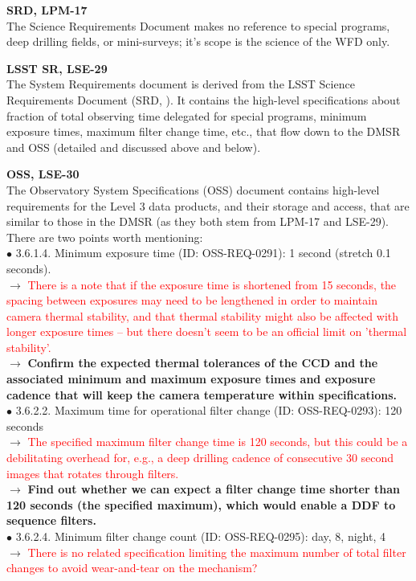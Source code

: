 \documentclass[DM,lsstdraft,toc]{lsstdoc}
\begin{document}
\noindent \textbf{SRD, LPM-17}\\
The Science Requirements Document \citep{LPM-17} makes no reference to special programs, deep drilling fields, or mini-surveys; it's scope is the science of the WFD only.

\noindent \textbf{LSST SR, LSE-29}\\
The System Requirements document \citep{LSE-29} is derived from the LSST Science Requirements Document (SRD, \citep{LPM-17}). It contains the high-level specifications about fraction of total observing time delegated for special programs, minimum exposure times, maximum filter change time, etc., that flow down to the DMSR and OSS (detailed and discussed above and below).

\noindent \textbf{OSS, LSE-30}\\
The Observatory System Specifications (OSS) document \citep{LSE-30} contains high-level requirements for the Level 3 data products, and their storage and access, that are similar to those in the DMSR (as they both stem from LPM-17 and LSE-29). There are two points worth mentioning: \\
$\bullet$ 3.6.1.4. Minimum exposure time (ID: OSS-REQ-0291): 1 second (stretch 0.1 seconds). \\
$\rightarrow$ \textcolor{red}{There is a note that if the exposure time is shortened from 15 seconds, the spacing between exposures may need to be lengthened in order to maintain camera thermal stability, and that thermal stability might also be affected with longer exposure times -- but there doesn't seem to be an official limit on 'thermal stability'.}\\
$\rightarrow$ \textbf{Confirm the expected thermal tolerances of the CCD and the associated minimum and maximum exposure times and exposure cadence that will keep the camera temperature within specifications.} \\
$\bullet$ 3.6.2.2. Maximum time for operational filter change (ID: OSS-REQ-0293): 120 seconds \\
$\rightarrow$ \textcolor{red}{The specified maximum filter change time is 120 seconds, but this could be a debilitating overhead for, e.g., a deep drilling cadence of consecutive 30 second images that rotates through filters.}\\
$\rightarrow$ \textbf{Find out whether we can expect a filter change time shorter than 120 seconds (the specified maximum), which would enable a DDF to sequence filters.} \\
$\bullet$ 3.6.2.4. Minimum filter change count (ID: OSS-REQ-0295): day, 8, night, 4 \\
$\rightarrow$ \textcolor{red}{There is no related specification limiting the maximum number of total filter changes to avoid wear-and-tear on the mechanism?} 
\end{document}
